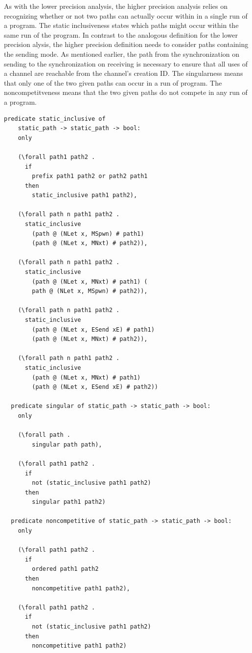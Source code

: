 \documentclass{article}
\begin{document}
As with the lower precision analysis, the higher precision analysis relies on recognizing
whether or not two paths can actually occur within in a single run of a program. The static
inclusiveness states which paths might occur within the same run of the program.
In contrast to the analogous definition for the lower precision
alysis, the higher precision definition needs to consider paths containing the
sending mode.  As mentioned earlier, the path from the synchronization on sending to the
synchronization on receiving is necessary to ensure that all uses of a channel are reachable
from the channel's creation ID.  The singularness means that only one of the two
given paths can occur in a run of program.  The noncompetitveness means that the two
given paths do not compete in any run of a program. 

\begin{lstlisting}[language=logic, mathescape]
  predicate static_inclusive of
    static_path -> static_path -> bool:
    only

    (\forall path1 path2 .
      if
        prefix path1 path2 or path2 path1
      then
        static_inclusive path1 path2),

    (\forall path n path1 path2 .
      static_inclusive
        (path @ (NLet x, MSpwn) # path1)
        (path @ (NLet x, MNxt) # path2)),

    (\forall path n path1 path2 .
      static_inclusive
        (path @ (NLet x, MNxt) # path1) (
        path @ (NLet x, MSpwn) # path2)),

    (\forall path n path1 path2 .
      static_inclusive
        (path @ (NLet x, ESend xE) # path1)
        (path @ (NLet x, MNxt) # path2)),

    (\forall path n path1 path2 .
      static_inclusive
        (path @ (NLet x, MNxt) # path1)
        (path @ (NLet x, ESend xE) # path2))

  predicate singular of static_path -> static_path -> bool:
    only 

    (\forall path .
        singular path path),

    (\forall path1 path2 .
      if
        not (static_inclusive path1 path2)
      then
        singular path1 path2)

  predicate noncompetitive of static_path -> static_path -> bool:
    only

    (\forall path1 path2 . 
      if
        ordered path1 path2
      then
        noncompetitive path1 path2),

    (\forall path1 path2 .
      if
        not (static_inclusive path1 path2)
      then
        noncompetitive path1 path2)
  \end{lstlisting}
\end{document}
